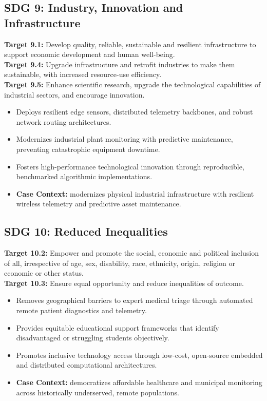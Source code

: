 \subsection{SDG 9: Industry, Innovation and Infrastructure}
\noindent\textbf{Target 9.1:} Develop quality, reliable, sustainable and resilient infrastructure to support economic development and human well-being. \\
\noindent\textbf{Target 9.4:} Upgrade infrastructure and retrofit industries to make them sustainable, with increased resource-use efficiency. \\
\noindent\textbf{Target 9.5:} Enhance scientific research, upgrade the technological capabilities of industrial sectors, and encourage innovation.
\begin{itemize}
  \item Deploys resilient edge sensors, distributed telemetry backbones, and robust network routing architectures.
  \item Modernizes industrial plant monitoring with predictive maintenance, preventing catastrophic equipment downtime.
  \item Fosters high-performance technological innovation through reproducible, benchmarked algorithmic implementations.
  \item \textbf{Case Context:} modernizes physical industrial infrastructure with resilient wireless telemetry and predictive asset maintenance.
\end{itemize}

\subsection{SDG 10: Reduced Inequalities}
\noindent\textbf{Target 10.2:} Empower and promote the social, economic and political inclusion of all, irrespective of age, sex, disability, race, ethnicity, origin, religion or economic or other status. \\
\noindent\textbf{Target 10.3:} Ensure equal opportunity and reduce inequalities of outcome.
\begin{itemize}
  \item Removes geographical barriers to expert medical triage through automated remote patient diagnostics and telemetry.
  \item Provides equitable educational support frameworks that identify disadvantaged or struggling students objectively.
  \item Promotes inclusive technology access through low-cost, open-source embedded and distributed computational architectures.
  \item \textbf{Case Context:} democratizes affordable healthcare and municipal monitoring across historically underserved, remote populations.
\end{itemize}
